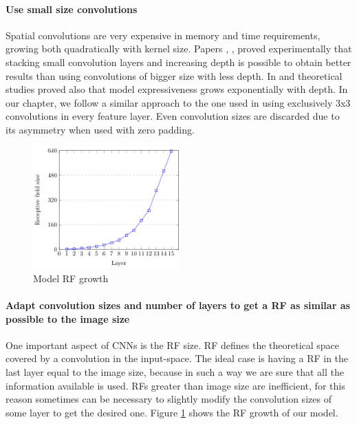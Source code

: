 \paragraph{Use small size convolutions} Spatial convolutions are very expensive in memory and time requirements, growing both quadratically with kernel size. Papers \citep{vggnet}, \citep{he2016deep},  \citep{szegedy2016rethinking} proved experimentally that stacking small convolution layers and increasing depth is possible to obtain better results than using convolutions of bigger size with less depth. In \citep{eldan2016power} and \citep{cohen2016expressive} theoretical studies proved also that model expressiveness grows exponentially with depth. In our chapter, we follow a similar approach to the one used in \citep{vggnet} using exclusively 3x3 convolutions in every feature layer. Even convolution sizes are discarded due to its asymmetry when used with zero padding.

\begin{figure}[ht!]
	\centering
	\includegraphics[width=0.50\textwidth]{Figures/chapter_classification/figures/receptive_field_640.pdf}
	\caption{Model RF growth}
	\label{class2:fig:rf_graph}
\end{figure}

\paragraph{Adapt convolution sizes and number of layers to get a RF as similar as possible to the image size} One important aspect of CNNs is the RF size. RF defines the theoretical space covered by a convolution in the input-space. The ideal case is having a RF in the last layer equal to the image size, because in such a way we are sure that all the information available is used. RFs greater than image size are inefficient, for this reason sometimes can be necessary to slightly modify the convolution sizes of some layer to get the desired one. Figure \ref{class2:fig:rf_graph} shows the RF growth of our model.

